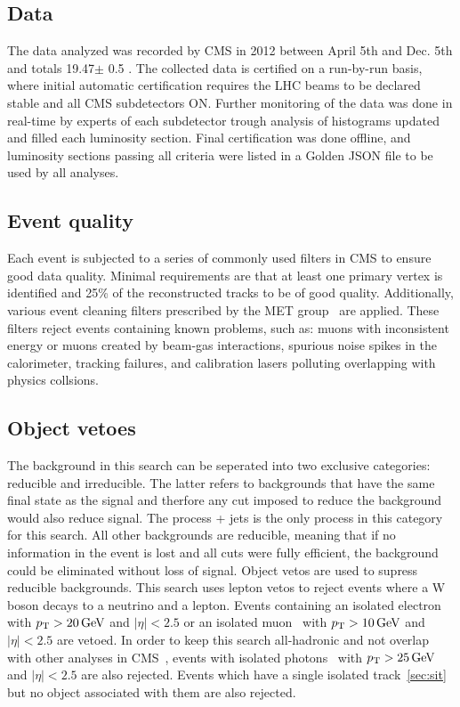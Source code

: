 \subsection{Data}
The data analyzed was recorded by CMS in 2012 between April 5th and Dec. 5th and
totals 19.47$\pm$ 0.5 \fbinv. The collected data is certified on a run-by-run 
basis, where initial automatic certification requires the LHC beams to be declared
stable and all CMS subdetectors ON. Further monitoring of the data was done in real-time
by experts of each subdetector trough analysis of histograms updated and filled
each luminosity section. Final certification was done offline, and luminosity sections passing
all criteria were listed in a Golden JSON file to be used by all analyses. 

\subsection{Event quality}

Each event is subjected to a series of commonly used filters in CMS to ensure good
data quality. Minimal requirements are that at least one primary vertex is identified 
and 25\% of the reconstructed tracks to be of good quality. Additionally, various event 
cleaning filters prescribed by the MET group~\cite{ref:MET-filters} are applied. These 
filters reject events containing known problems, such as: muons with inconsistent energy or 
muons created by beam-gas interactions, spurious noise spikes in the calorimeter, tracking
failures, and calibration lasers polluting overlapping with physics collsions. 





\subsection{Object vetoes}

The background in this search can be seperated into two exclusive 
categories: reducible and irreducible. The latter refers to backgrounds 
that have the same final state as the signal and therfore any cut imposed 
to reduce the background would also reduce signal. The process 
\znunu + jets is the only process in this category for this search. 
All other backgrounds are reducible, meaning that if no information 
in the event is lost and all cuts were fully efficient, the background 
could be eliminated without loss of signal. Object vetos are used to supress 
reducible backgrounds. This search uses lepton vetos to reject events 
where a W boson decays to a neutrino and a lepton. Events containing 
an isolated electron~\cite{PAS-EGM-10-004} with $p_{\mathrm{T}} > 20\,\text{Ge\hspace{-.08em}V}$ 
and $|\eta| < 2.5$ or an isolated muon~\cite{PAS-MUO-10-002}
with $p_{\mathrm{T}} > 10\,\text{Ge\hspace{-.08em}V}$ and $|\eta| < 2.5$ are vetoed. In order to keep this 
search all-hadronic and not overlap with other analyses in 
CMS~\cite{CMS-PAS-SUS-14-008,photon7TeV},
events with isolated photons~\cite{PAS-EGM-10-006}  with $p_{\mathrm{T}} > 25\,\text{Ge\hspace{-.08em}V}$ 
and $|\eta| < 2.5$ are also rejected. Events which have a single 
isolated track~\ref{sec:sit} but no object associated with them are 
also rejected.

